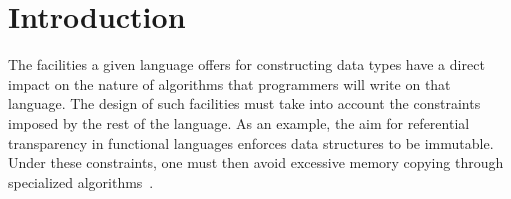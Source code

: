 \documentclass{sig-alternate}
\begin{document}



\section{Introduction}

The facilities a given language offers for constructing data types have a 
direct impact on the nature of algorithms that programmers will write on that 
language.
The design of such facilities must take into account the constraints imposed by 
the rest of the language.
As an example, the aim for referential transparency in functional languages 
enforces data structures to be immutable.
Under these constraints, one must then avoid excessive memory copying through 
specialized algorithms~\cite{okasaki.purely}.
\end{document}
